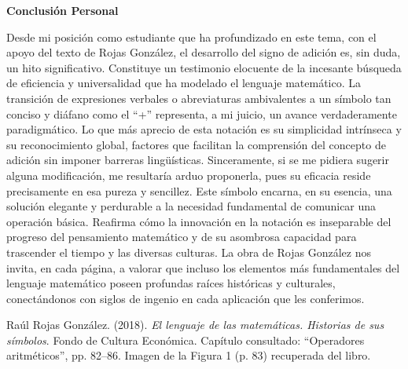 \documentclass[11pt, a4paper]{article}
\begin{document}
\vspace*{1 cm}
\begin{center}
    {\fontsize{24}{26}\selectfont\textbf{Conclusión Personal}}
\end{center}
\vspace*{0.8em}

Desde mi posición como estudiante que ha profundizado en este tema, con el apoyo del texto de Rojas González, el desarrollo del signo de adición es, sin duda, un hito significativo. Constituye un testimonio elocuente de la incesante búsqueda de eficiencia y universalidad que ha modelado el lenguaje matemático. La transición de expresiones verbales o abreviaturas ambivalentes a un símbolo tan conciso y diáfano como el ``+'' representa, a mi juicio, un avance verdaderamente paradigmático. Lo que más aprecio de esta notación es su simplicidad intrínseca y su reconocimiento global, factores que facilitan la comprensión del concepto de adición sin imponer barreras lingüísticas. Sinceramente, si se me pidiera sugerir alguna modificación, me resultaría arduo proponerla, pues su eficacia reside precisamente en esa pureza y sencillez. Este símbolo encarna, en su esencia, una solución elegante y perdurable a la necesidad fundamental de comunicar una operación básica. Reafirma cómo la innovación en la notación es inseparable del progreso del pensamiento matemático y de su asombrosa capacidad para trascender el tiempo y las diversas culturas. La obra de Rojas González nos invita, en cada página, a valorar que incluso los elementos más fundamentales del lenguaje matemático poseen profundas raíces históricas y culturales, conectándonos con siglos de ingenio en cada aplicación que les conferimos.

\newpage

\begin{thebibliography}{99}
     Raúl Rojas González. (2018). \textit{El lenguaje de las matemáticas. Historias de sus símbolos}. Fondo de Cultura Económica. Capítulo consultado: “Operadores aritméticos”, pp. 82–86. Imagen de la Figura 1 (p. 83) recuperada del libro.
\end{thebibliography}
\end{document}
